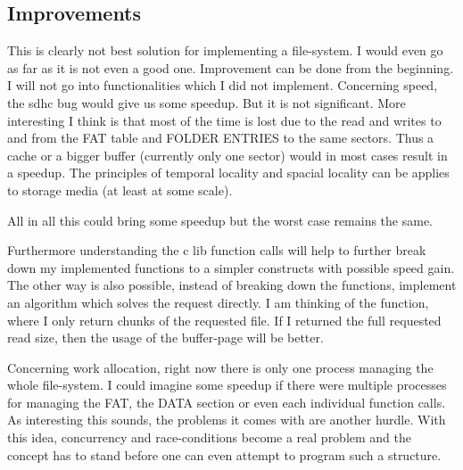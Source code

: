 \subsection{Improvements}
This is clearly not best solution for implementing a file-system. I would even go as far as it is not even a good one. Improvement can be done from the beginning. I will not go into functionalities which I did not implement. Concerning speed, the sdhc bug would give us some speedup. But it is not significant. More interesting I think is that most of the time is lost due to the read and writes to and from the FAT table and FOLDER ENTRIES to the same sectors. Thus a cache or a bigger buffer (currently only one sector) would in most cases result in a speedup. The principles of temporal locality and spacial locality can be applies to storage media (at least at some scale).

All in all this could bring some speedup but the worst case remains the same. 

Furthermore understanding the c lib function calls will help to further break down my implemented functions to a simpler constructs with possible speed gain. The other way is also possible, instead of breaking down the functions, implement an algorithm which solves the request directly. I am thinking of the  function, where I only return chunks of the requested file. If I returned the full requested read size, then the usage of the buffer-page will be better.

Concerning work allocation, right now there is only one process managing the whole file-system. I could imagine some speedup if there were multiple processes for managing the FAT, the DATA section or even each individual function calls. As interesting this sounds, the problems it comes with are another hurdle. With this idea, concurrency and race-conditions become a real problem and the concept has to stand before one can even attempt to program such a structure. 